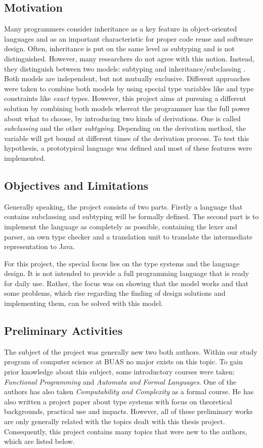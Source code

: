 \subsection{Motivation}
Many programmers consider inheritance as a key feature in object-oriented
languages and as an important characteristic for proper code reuse and
software design. Often, inheritance is put on the same level as subtyping
and is not distinguished. However, many researchers do not agree with
this notion. Instead, they distinguish between two models: subtyping and
inheritance/subclassing \cite{taivalsaari_notion_1996}.
Both models are independent, but not mutually exclusive. Different approaches were
taken to combine both models by using special type variables like \mytype
and type constraints like \emph{exact} types. However, this project aims at
pursuing a different solution by combining both models whereat the programmer has
the full power about what to choose, by introducing two kinds of derivations.
One is called \emph{subclassing} and the other \emph{subtyping}. Depending
on the derivation method, the \mytype variable will get bound at different
times of the derivation process. To test this hypothesis, a prototypical 
language was defined and most of these features were implemented.

\subsection{Objectives and Limitations}
Generally speaking, the project consists of two parts. Firstly a language
that contains subclassing and subtyping will be formally defined. The
second part is to implement the language as completely as possible, containing
the lexer and parser, an own type checker and a translation unit to translate
the intermediate representation to Java.

For this project, the special focus lies on the type systems and the language
design. It is not intended to provide a full programming language that is
ready for daily use. Rather, the focus was on showing that the model works and that some
problems, which rise regarding the finding of design solutions and implementing them, can be solved
with this model.

\subsection{Preliminary Activities}
The subject of the project was generally new two both authors. Within
our study program of computer science at BUAS no major exists on this topic. To gain prior
knowledge about this subject, some introductory courses were taken:
\emph{Functional Programming} and \emph{Automata and Formal Languages}.
One of the authors has also taken \emph{Computability and Complexity} as
a formal course. He has also written a project paper about type systems
with focus on theoretical backgrounds, practical use and impacts. However, all
of these preliminary works are only generally related with the topics dealt with
this thesis project. Consequently, this project contains many topics that
were new to the authors, which are listed below.

